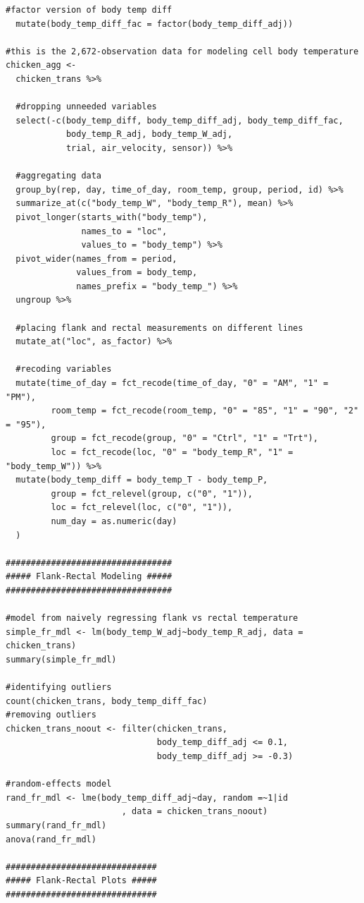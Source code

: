 \documentclass[a4paper, 10pt, titlepage]{article}
\begin{document}
\begin{lstlisting}[basicstyle = \footnotesize \ttfamily]
  #factor version of body temp diff
  mutate(body_temp_diff_fac = factor(body_temp_diff_adj))

#this is the 2,672-observation data for modeling cell body temperature
chicken_agg <- 
  chicken_trans %>%
  
  #dropping unneeded variables
  select(-c(body_temp_diff, body_temp_diff_adj, body_temp_diff_fac,
            body_temp_R_adj, body_temp_W_adj,
            trial, air_velocity, sensor)) %>%
  
  #aggregating data
  group_by(rep, day, time_of_day, room_temp, group, period, id) %>%
  summarize_at(c("body_temp_W", "body_temp_R"), mean) %>%
  pivot_longer(starts_with("body_temp"), 
               names_to = "loc", 
               values_to = "body_temp") %>%
  pivot_wider(names_from = period, 
              values_from = body_temp, 
              names_prefix = "body_temp_") %>%
  ungroup %>%
  
  #placing flank and rectal measurements on different lines
  mutate_at("loc", as_factor) %>%
  
  #recoding variables
  mutate(time_of_day = fct_recode(time_of_day, "0" = "AM", "1" = "PM"),
         room_temp = fct_recode(room_temp, "0" = "85", "1" = "90", "2" = "95"),
         group = fct_recode(group, "0" = "Ctrl", "1" = "Trt"),
         loc = fct_recode(loc, "0" = "body_temp_R", "1" = "body_temp_W")) %>%
  mutate(body_temp_diff = body_temp_T - body_temp_P,
         group = fct_relevel(group, c("0", "1")),
         loc = fct_relevel(loc, c("0", "1")),
         num_day = as.numeric(day)
  )

#################################
##### Flank-Rectal Modeling #####
#################################

#model from naively regressing flank vs rectal temperature
simple_fr_mdl <- lm(body_temp_W_adj~body_temp_R_adj, data = chicken_trans)
summary(simple_fr_mdl)

#identifying outliers
count(chicken_trans, body_temp_diff_fac)
#removing outliers
chicken_trans_noout <- filter(chicken_trans, 
                              body_temp_diff_adj <= 0.1, 
                              body_temp_diff_adj >= -0.3)

#random-effects model
rand_fr_mdl <- lme(body_temp_diff_adj~day, random =~1|id
                       , data = chicken_trans_noout)
summary(rand_fr_mdl)
anova(rand_fr_mdl)

##############################
##### Flank-Rectal Plots #####
##############################


\end{lstlisting}
\end{document}
